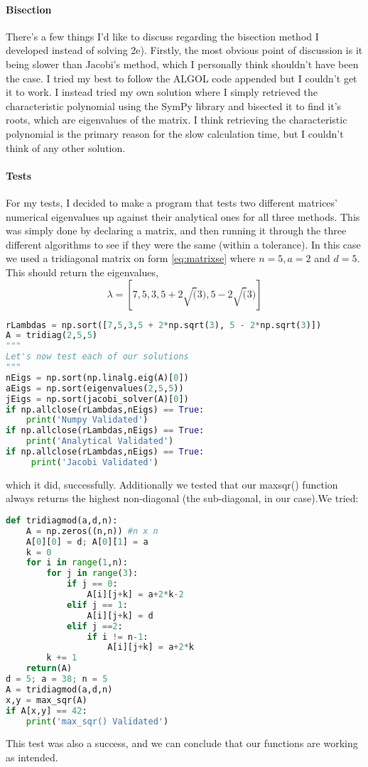 \documentclass{article}
\begin{document}
\paragraph{Bisection} \newline
There's a few things I'd like to discuss regarding the bisection method I developed instead of solving 2e). Firstly, the most obvious point of discussion is it being slower than Jacobi's method, which I personally think shouldn't have been the case. \newline
I tried my best to follow the ALGOL code appended but I couldn't get it to work. I instead tried my own solution where I simply retrieved the characteristic polynomial using the SymPy library and bisected it to find it's roots, which are eigenvalues of the matrix. I think retrieving the characteristic polynomial is the primary reason for the slow calculation time, but I couldn't think of any other solution. 
\paragraph{Tests} \newline
For my tests, I decided to make a program that tests two different matrices' numerical eigenvalues up against their analytical ones for all three methods. \newline
This was simply done by declaring a matrix, and then running it through the three different algorithms to see if they were the same (within a tolerance). In this case we used a tridiagonal matrix on form \ref{eq:matrixse} where $n = 5, a = 2$ and $d = 5$. This should return the eigenvalues, $$\lambda = [7,5,3,5 + 2\sqrt(3), 5 - 2\sqrt(3)]$$
\begin{lstlisting}[language=Python]
rLambdas = np.sort([7,5,3,5 + 2*np.sqrt(3), 5 - 2*np.sqrt(3)])
A = tridiag(2,5,5)
"""
Let's now test each of our solutions
"""
nEigs = np.sort(np.linalg.eig(A)[0])
aEigs = np.sort(eigenvalues(2,5,5))
jEigs = np.sort(jacobi_solver(A)[0])
if np.allclose(rLambdas,nEigs) == True:
    print('Numpy Validated')
if np.allclose(rLambdas,nEigs) == True:
    print('Analytical Validated')
if np.allclose(rLambdas,nEigs) == True:
     print('Jacobi Validated')
\end{lstlisting} \newline
which it did, successfully. \newpage
Additionally we tested that our max\textunderscore sqr() function always returns the highest non-diagonal (the sub-diagonal, in our case).\newline We tried:
\begin{lstlisting}[language=Python]
def tridiagmod(a,d,n):
    A = np.zeros((n,n)) #n x n
    A[0][0] = d; A[0][1] = a
    k = 0
    for i in range(1,n):
        for j in range(3):
            if j == 0:
                A[i][j+k] = a+2*k-2
            elif j == 1:
                A[i][j+k] = d
            elif j ==2:
                if i != n-1:
                    A[i][j+k] = a+2*k
        k += 1
    return(A)
d = 5; a = 38; n = 5
A = tridiagmod(a,d,n)
x,y = max_sqr(A)
if A[x,y] == 42:
    print('max_sqr() Validated')
\end{lstlisting} \newline
This test was also a success, and we can conclude that our functions are working as intended.
\end{document}
